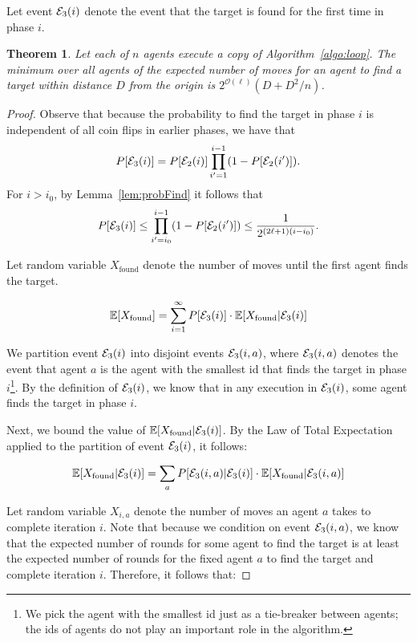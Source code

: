 \documentclass[11pt]{article}
\newtheorem{theorem}{Theorem}[section]
\newcommand{\E}{\mathbb{E}}
\newcommand{\BO}{\mathcal{O}}
\begin{document}
Let event ${\cal E}_3(i)$ denote the event that the target is found for the first time in phase $i$.

\begin{theorem}\label{theorem:upper}
Let each of $n$ agents execute a copy of Algorithm~\ref{algo:loop}. The minimum over all agents of the expected number of moves for an agent to find a target within distance $D$ from the origin is $2^{\BO(\ell)}(D+D^2/n)$.
\end{theorem}
\begin{proof}
Observe that because the probability to find the target in phase $i$ is independent of all coin flips in earlier phases, we have that
\begin{equation*}
P[{\cal E}_3(i)]=P[{\cal E}_2(i)]\prod_{i'=1}^{i-1}(1-P[{\cal E}_2(i')]).
\end{equation*}
For $i> i_0$, by Lemma~\ref{lem:probFind} it follows that
\begin{equation*}
P[{\cal E}_3(i)]\leq \prod_{i'=i_0}^{i-1}(1-P[{\cal E}_2(i')])\leq \frac{1}{2^{(2\ell+1)(i-i_0)}}.
\end{equation*}

Let random variable $X_{\text{found}}$ denote the number of moves until the first agent finds the target.

\begin{equation}
\E[X_{\text{found}}] = \sum_{i=1}^{\infty} P[{\cal E}_3(i)]\cdot \E[X_{\text{found}} | {\cal E}_3(i)]
\end{equation}

We partition event ${\cal E}_3(i)$ into disjoint events ${\cal E}_3(i,a)$, where ${\cal E}_3(i,a)$ denotes the event that agent $a$ is the agent with the smallest id that finds the target in phase $i$\footnote{We pick the agent with the smallest id just as a tie-breaker between agents; the ids of agents do not play an important role in the algorithm.}. By the definition of ${\cal E}_3(i)$, we know that in any execution in ${\cal E}_3(i)$, some agent finds the target in phase $i$.

Next, we bound the value of $\E[X_{\text{found}}| {\cal E}_3(i)] $. By the Law of Total Expectation applied to the partition of event ${\cal E}_3(i)$, it follows:

\begin{equation*}
\E[X_{\text{found}}| {\cal E}_3(i)] = \sum_{a} P[{\cal E}_3(i,a) | {\cal E}_3(i)] \cdot \E[X_{\text{found}} | {\cal E}_3(i,a)] 
\end{equation*}

Let random variable $X_{i,a}$ denote the number of moves an agent $a$ takes to complete iteration $i$. Note that because we condition on event ${\cal E}_3(i,a)$, we know that the expected number of rounds for some agent to find the target is at least the expected number of rounds for the fixed agent $a$ to find the target and complete iteration $i$. Therefore, it follows that: 


\end{proof}
\end{document}
